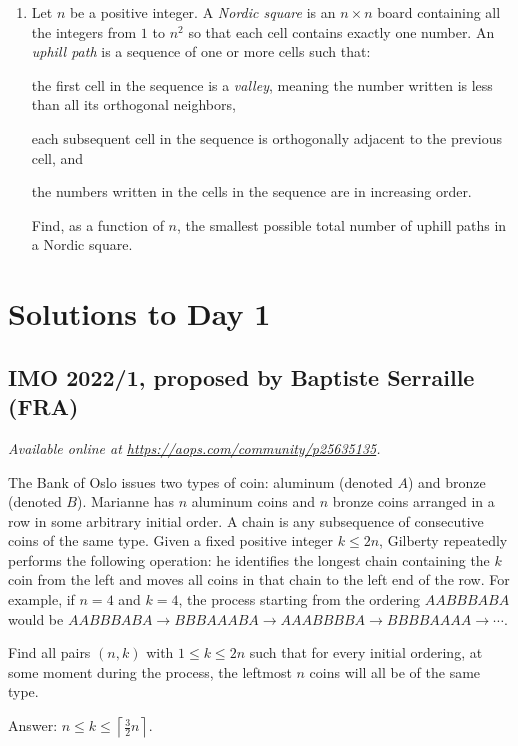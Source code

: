 \documentclass[11pt]{scrartcl}
\begin{document}
\begin{enumerate}[\bfseries 1.]
\item %
Let $n$ be a positive integer.
A \emph{Nordic square} is an $n \times n$ board
containing all the integers from $1$ to $n^2$
so that each cell contains exactly one number.
An \emph{uphill path} is a sequence of one or more cells such that:
\begin{enumerate}
  \ii the first cell in the sequence is a \emph{valley},
  meaning the number written is less than all its orthogonal neighbors,

  \ii each subsequent cell in the sequence is orthogonally
  adjacent to the previous cell, and

  \ii the numbers written in the cells in the sequence are in increasing order.
\end{enumerate}
Find, as a function of $n$, the smallest possible total number
of uphill paths in a Nordic square.

\end{enumerate}
\pagebreak

\section{Solutions to Day 1}
\subsection{IMO 2022/1, proposed by Baptiste Serraille (FRA)}
\textsl{Available online at \url{https://aops.com/community/p25635135}.}
\begin{mdframed}[style=mdpurplebox,frametitle={Problem statement}]
The Bank of Oslo issues two types of coin: aluminum (denoted $A$) and bronze
(denoted $B$). Marianne has $n$ aluminum coins and $n$ bronze coins arranged in a
row in some arbitrary initial order.
A chain is any subsequence of consecutive coins of the same type.
Given a fixed positive integer $k \leq 2n$,
Gilberty repeatedly performs the following operation:
he identifies the longest chain containing the $k$ coin from the left
and moves all coins in that chain to the left end of the row.
For example, if $n=4$ and $k=4$, the process starting
from the ordering $AABBBABA$ would be
$AABBBABA \to BBBAAABA \to AAABBBBA \to BBBBAAAA \to \dotsb$.

Find all pairs $(n,k)$ with $1 \leq k \leq 2n$
such that for every initial ordering,
at some moment during the process,
the leftmost $n$ coins will all be of the same type.
\end{mdframed}
Answer: $n \le k \le \left\lceil \frac 32 n \right\rceil$.
\end{document}
